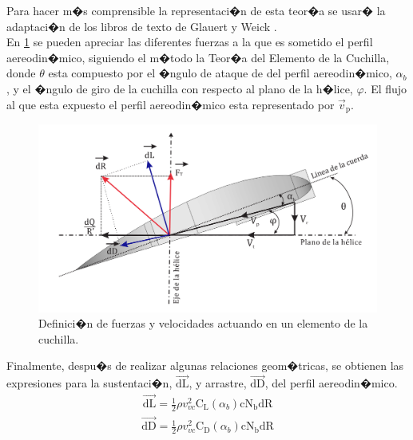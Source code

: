\documentclass[10pt,a4paper]{book}
\begin{document}
Para hacer m�s comprensible la representaci�n de esta teor�a se usar� la adaptaci�n de los libros de texto de Glauert \cite{Glauert} y Weick \cite{Weick}. \\

En \ref{BETFuerzas} se pueden apreciar las diferentes fuerzas a la que es sometido el perfil aereodin�mico, siguiendo el m�todo la Teor�a del Elemento de la Cuchilla, donde $ \theta$ esta compuesto por el �ngulo de ataque de del perfil aereodin�mico, $\alpha_{b}$, y el �ngulo de giro de la cuchilla con respecto al plano de la h�lice, $\varphi$. El flujo al que esta expuesto el perfil aereodin�mico esta representado por $\overrightarrow{v}_{\text{p}}$. 

\begin{figure}[H]
\begin{center}
\includegraphics[scale=0.1]{Imagenes/BET5.png}  
\caption{Definici�n de fuerzas y velocidades actuando en un elemento de la cuchilla.}
\label{BETFuerzas}
\end{center}
\end{figure}


Finalmente, despu�s de realizar  algunas relaciones geom�tricas, se obtienen las expresiones para la sustentaci�n, $\overrightarrow{\text{dL}}$, y arrastre, $\overrightarrow{\text{dD}}$, del perfil aereodin�mico.
\begin{align}
\label{eq:sust}
\overrightarrow{\text{dL}} = \frac{1}{2} \rho v_{vc}^{2}\text{C}_{\text{L}} (\alpha_{b})\text{c}\text{N}_{\text{b}}\text{dR}
\end{align}
\begin{align}
\label{eq:arra}
\overrightarrow{\text{dD}} = \frac{1}{2} \rho v_{vc}^{2}\text{C}_{\text{D}} (\alpha_{b})\text{c}\text{N}_{\text{b}}\text{dR}
\end{align}
\end{document}
